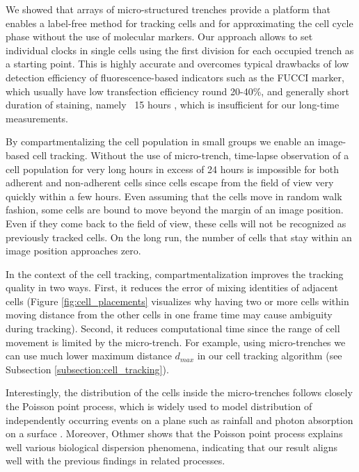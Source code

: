\documentclass[pdftex,12pt,a4paper]{report}
\begin{document}
We showed that arrays of micro-structured trenches provide a platform that enables a label-free method for tracking cells and for approximating the cell cycle phase without the use of molecular markers. Our approach allows to set individual clocks in single cells using the first division for each occupied trench as a starting point. This is highly accurate and overcomes typical drawbacks of low detection efficiency of fluorescence-based indicators such as the FUCCI marker, which usually have low transfection efficiency round 20-40\%, and generally short duration of staining, namely ~15 hours \cite{zielke2015fucci}, which is insufficient for our long-time measurements.

By compartmentalizing the cell population in small groups we enable an image-based cell tracking. Without the use of micro-trench, time-lapse observation of a cell population for very long hours in excess of 24 hours is impossible for both adherent and non-adherent cells since cells escape from the field of view very quickly within a few hours. Even assuming that the cells move in random walk fashion, some cells are bound to move beyond the margin of an image position. Even if they come back to the field of view, these cells will not be recognized as previously tracked cells. On the long run, the number of cells that stay within an image position approaches zero.

In the context of the cell tracking, compartmentalization improves the tracking quality in two ways. First, it reduces the error of mixing identities of adjacent cells (Figure \ref{fig:cell_placements} visualizes why having two or more cells within moving distance from the other cells in one frame time may cause ambiguity during tracking). Second, it reduces computational time since the range of cell movement is limited by the micro-trench. For example, using micro-trenches we can use much lower maximum distance $d_{max}$ in our cell tracking algorithm (see Subsection \ref{subsection:cell_tracking}).

Interestingly, the distribution of the cells inside the micro-trenches follows closely the Poisson point process, which is widely used to model distribution of independently occurring events on a plane such as rainfall \cite{rodriguez1987some} and photon absorption on a surface \cite{scargle1998studies}. Moreover, Othmer \cite{othmer1988models} shows that the Poisson point process explains well various biological dispersion phenomena, indicating that our result aligns well with the previous findings in related processes.
\end{document}
